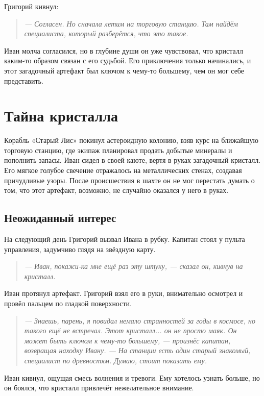 \documentclass[12pt,a4paper]{book}
\newenvironment{dialogue}{\begin{quote}\itshape}{\end{quote}} %
\begin{document}
Григорий кивнул:

\begin{dialogue}
--- Согласен. Но сначала летим на торговую станцию. Там найдём специалиста, который разберётся, что это такое.
\end{dialogue}

Иван молча согласился, но в глубине души он уже чувствовал, что кристалл каким-то образом связан с его судьбой. Его приключения только начинались, и этот загадочный артефакт был ключом к чему-то большему, чем он мог себе представить.

\chapter{Тайна кристалла}

Корабль «Старый Лис» покинул астероидную колонию, взяв курс на ближайшую торговую станцию, где экипаж планировал продать добытые минералы и пополнить запасы. Иван сидел в своей каюте, вертя в руках загадочный кристалл. Его мягкое голубое свечение отражалось на металлических стенах, создавая причудливые узоры. После происшествия в шахте он не мог перестать думать о том, что этот артефакт, возможно, не случайно оказался у него в руках.

\section*{Неожиданный интерес}

На следующий день Григорий вызвал Ивана в рубку. Капитан стоял у пульта управления, задумчиво глядя на звёздную карту.

\begin{dialogue}
--- Иван, покажи-ка мне ещё раз эту штуку, --- сказал он, кивнув на кристалл.
\end{dialogue}

Иван протянул артефакт. Григорий взял его в руки, внимательно осмотрел и провёл пальцем по гладкой поверхности.

\begin{dialogue}
--- Знаешь, парень, я повидал немало странностей за годы в космосе, но такого ещё не встречал. Этот кристалл... он не просто маяк. Он может быть ключом к чему-то большему, --- произнёс капитан, возвращая находку Ивану. --- На станции есть один старый знакомый, специалист по древностям. Думаю, стоит показать ему.
\end{dialogue}

Иван кивнул, ощущая смесь волнения и тревоги. Ему хотелось узнать больше, но он боялся, что кристалл привлечёт нежелательное внимание.
\end{document}
